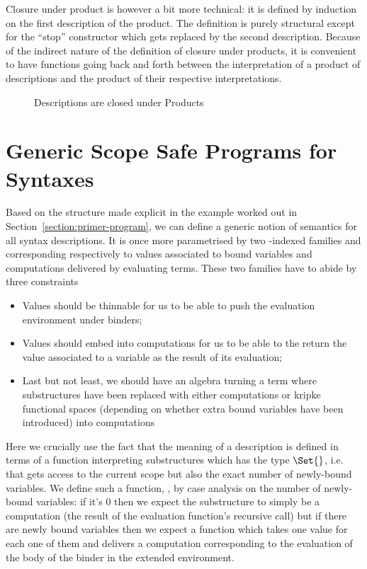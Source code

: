 Closure under product is however a bit more technical: it is
defined by induction on the first description of the product.
The definition is purely structural except for the ``stop''
constructor which gets replaced by the second description. Because
of the indirect nature of the definition of closure under
products, it is convenient to have functions going back and
forth between the interpretation of a product of descriptions
and the product of their respective interpretations.

\begin{figure}[h]
\begin{minipage}{0.45\textwidth}
\end{minipage}\hspace{2em}
\begin{minipage}{0.45\textwidth}
\end{minipage}
\caption{Descriptions are closed under Products}
\end{figure}


\section{Generic Scope Safe Programs for Syntaxes}\label{section:semantics}

Based on the structure made explicit in the example worked out
in Section~\ref{section:primer-program}, we can define a generic notion of
semantics for all syntax descriptions. It is once more parametrised
by two -indexed families  and  corresponding
respectively to values associated to bound variables and
computations delivered by evaluating terms. These two families
have to abide by three constraints
\begin{itemize}
\item Values should be thinnable for us to be able to push the
      evaluation environment under binders;
\item Values should embed into computations for us to be able
      to the return the value associated to a variable as the
      result of its evaluation;
\item Last but not least, we should have an algebra turning
      a term where substructures have been replaced with
      either computations or kripke functional spaces (depending
      on whether extra bound variables have been introduced)
      into computations
\end{itemize}
Here we crucially use the fact that the meaning of a description is
defined in terms of a function interpreting substructures which has
the type     $\Set{}$, i.e. that gets access
to the current scope but also the exact number of newly-bound variables.
We define such a function, , by case analysis on the number
of newly-bound variables: if it's $0$ then we expect the substructure
to simply be a computation (the result of the evaluation function's
recursive call) but if there are newly bound variables then we expect
a function which takes one value for each one of them and delivers
a computation corresponding to the evaluation of the body of the binder
in the extended environment.

